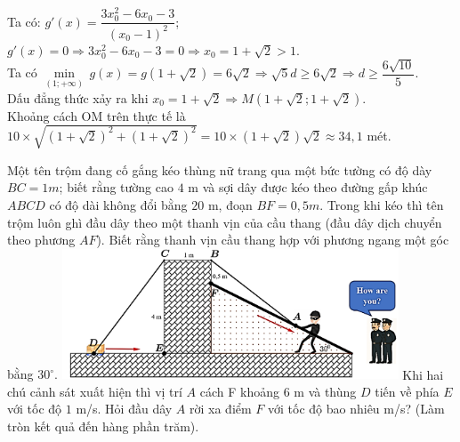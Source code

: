 \begin{ex}
{Ta có: $g'(x)=\dfrac{3x_0^2-6x_0-3}{\left(x_0-1\right)^2}$; $g'(x)=0\Rightarrow 3x_0^2-6x_0-3=0\Rightarrow x_0=1+\sqrt{2}>1$.\\
Ta có $\min \limits_{\left(1;+\infty \right)}\,g(x)=g\left(1+\sqrt{2}\right)=6\sqrt{2}\Rightarrow \sqrt{5}d\ge 6\sqrt{2}\Rightarrow d\ge \dfrac{6\sqrt{10}}{5}$.\\
Dấu đẳng thức xảy ra khi $x_0=1+\sqrt{2} \Rightarrow M\left(1+\sqrt{2};1+\sqrt{2}\right)$.\\
Khoảng cách OM trên thực tế là $10\times \sqrt{\left(1+\sqrt{2}\right)^2+\left(1+\sqrt{2}\right)^2}=10\times \left(1+\sqrt{2}\right)\sqrt{2}\approx 34{,}1$ mét.
}
\end{ex}

\begin{ex}%
\immini
{
    Một tên trộm đang cố gắng kéo thùng nữ trang qua một bức tường có độ dày $ BC=1m$; biết rằng tường cao $4$ m và sợi dây được kéo theo đường gấp khúc $ABCD$ có độ dài không đổi bằng $20$ m, đoạn $ BF=0{,}5m$. Trong khi kéo thì tên trộm luôn ghì đầu dây theo một thanh vịn của cầu thang (đầu dây dịch chuyển theo phương $AF$). Biết rằng thanh vịn cầu thang hợp với phương ngang một góc bằng $30^{\circ}$.
}
{
    \includegraphics[width=10cm]{img/HXN-1-20}
}
Khi hai chú cảnh sát xuất hiện thì vị trí $A$ cách F khoảng $6$ m và thùng $D$ tiến về phía $E$ với tốc độ $1$ m/s. Hỏi đầu dây $A$ rời xa điểm $F$ với tốc độ bao nhiêu m/s? (Làm tròn kết quả đến hàng phần trăm).
\end{ex}

